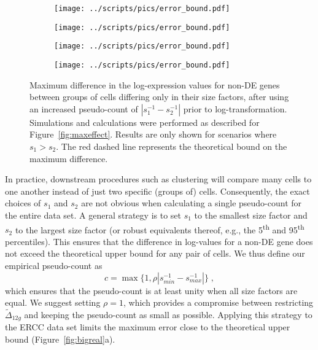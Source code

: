 \documentclass[10pt,letterpaper]{article}
\begin{document}
\begin{figure}[btp]
\centering
\begin{subfigure}[b]{0.49\textwidth}
    \texttt{[image: ../scripts/pics/error\_bound.pdf]}
    \caption{}
\end{subfigure}
\begin{subfigure}[b]{0.49\textwidth}
    \texttt{[image: ../scripts/pics/error\_bound.pdf]}
    \caption{}
\end{subfigure}
\begin{subfigure}[b]{0.49\textwidth}
    \texttt{[image: ../scripts/pics/error\_bound.pdf]}
    \caption{}
\end{subfigure}
\begin{subfigure}[b]{0.49\textwidth}
    \texttt{[image: ../scripts/pics/error\_bound.pdf]}
    \caption{}
\end{subfigure}
\caption{Maximum difference in the log-expression values for non-DE genes between groups of cells differing only in their size factors, 
after using an increased pseudo-count of $|s_1^{-1} - s_2^{-1}|$ prior to log-transformation.
Simulations and calculations were performed as described for Figure~\ref{fig:maxeffect}.
Results are only shown for scenarios where $s_1 > s_2$.
The red dashed line represents the theoretical bound on the maximum difference.
}
\label{fig:cappederr}
\end{figure}

In practice, downstream procedures such as clustering will compare many cells to one another instead of just two specific (groups of) cells.
Consequently, the exact choices of $s_1$ and $s_2$ are not obvious when calculating a single pseudo-count for the entire data set.
A general strategy is to set $s_1$ to the smallest size factor and $s_2$ to the largest size factor
(or robust equivalents thereof, e.g., the 5\textsuperscript{th} and 95\textsuperscript{th} percentiles).
This ensures that the difference in log-values for a non-DE gene does not exceed the theoretical upper bound for any pair of cells.
We thus define our empirical pseudo-count as
\[
\hat c = \max\{1, \rho |s_{min}^{-1} - s_{max}^{-1}|\} \;,
\]
which ensures that the pseudo-count is at least unity when all size factors are equal.
We suggest setting $\rho=1$, which provides a compromise between restricting $\tilde\Delta_{12g}$ and keeping the pseudo-count as small as possible.
Applying this strategy to the ERCC data set limits the maximum error close to the theoretical upper bound (Figure~\ref{fig:bigreal}a).
\end{document}
